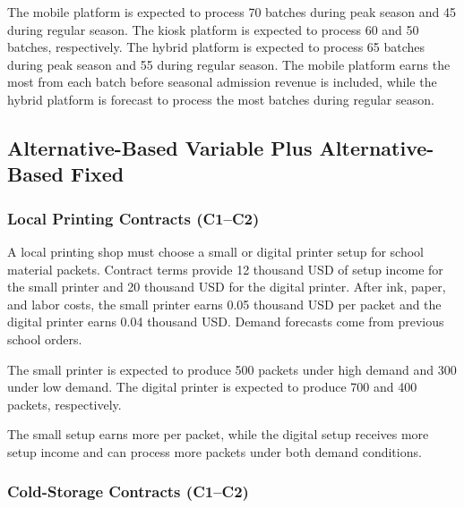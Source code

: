 	The mobile platform is expected to process 70 batches during peak season and 45 during regular season. The kiosk platform is expected to process 60 and 50 batches, respectively. The hybrid platform is expected to process 65 batches during peak season and 55 during regular season. The mobile platform earns the most from each batch before seasonal admission revenue is included, while the hybrid platform is forecast to process the most batches during regular season.

	
	\subsection{Alternative-Based Variable Plus Alternative-Based Fixed}
	\label{sec:alternative-based-variable-payoff-plus-alternative-based-fixed-payoff}


	\subsubsection{Local Printing Contracts (C1--C2)}
	\label{sec:problem16-local-printing-contracts-c1-c2}
	
	A local printing shop must choose a small or digital printer setup for school material packets. Contract terms provide 12 thousand USD of setup income for the small printer and 20 thousand USD for the digital printer. After ink, paper, and labor costs, the small printer earns 0.05 thousand USD per packet and the digital printer earns 0.04 thousand USD. Demand forecasts come from previous school orders.
	
	The small printer is expected to produce 500 packets under high demand and 300 under low demand. The digital printer is expected to produce 700 and 400 packets, respectively.
	
	The small setup earns more per packet, while the digital setup receives more setup income and can process more packets under both demand conditions.
	
	\subsubsection{Cold-Storage Contracts (C1--C2)}
	\label{sec:problem17-cold-storage-contracts-c1-c2}
	
